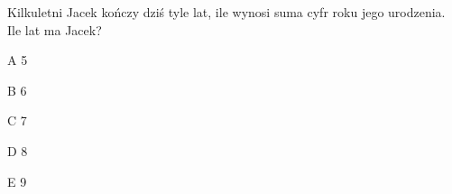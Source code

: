 \begin{tresc}
Kilkuletni Jacek kończy dziś tyle lat, ile wynosi suma cyfr roku jego urodzenia. Ile lat ma Jacek?
\end{tresc}
\begin{wariant}{A} 5 \end{wariant}
\begin{wariant}{B} 6 \end{wariant}
\begin{wariant}{C} 7 \end{wariant}
\begin{wariant}{D} 8 \end{wariant}
\begin{wariant}{E} 9 \end{wariant}

